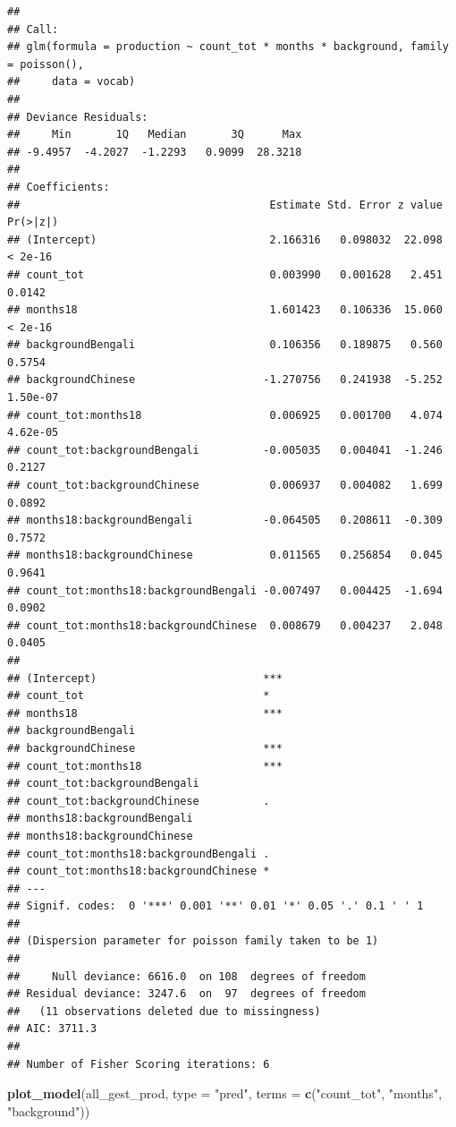 \documentclass[]{article}
\newenvironment{Shaded}{\begin{snugshade}}{\end{snugshade}}
\newcommand{\DataTypeTok}[1]{\textcolor[rgb]{0.13,0.29,0.53}{#1}}
\newcommand{\KeywordTok}[1]{\textcolor[rgb]{0.13,0.29,0.53}{\textbf{#1}}}
\newcommand{\NormalTok}[1]{#1}
\newcommand{\StringTok}[1]{\textcolor[rgb]{0.31,0.60,0.02}{#1}}
\begin{document}
\begin{verbatim}
## 
## Call:
## glm(formula = production ~ count_tot * months * background, family = poisson(), 
##     data = vocab)
## 
## Deviance Residuals: 
##     Min       1Q   Median       3Q      Max  
## -9.4957  -4.2027  -1.2293   0.9099  28.3218  
## 
## Coefficients:
##                                       Estimate Std. Error z value Pr(>|z|)
## (Intercept)                           2.166316   0.098032  22.098  < 2e-16
## count_tot                             0.003990   0.001628   2.451   0.0142
## months18                              1.601423   0.106336  15.060  < 2e-16
## backgroundBengali                     0.106356   0.189875   0.560   0.5754
## backgroundChinese                    -1.270756   0.241938  -5.252 1.50e-07
## count_tot:months18                    0.006925   0.001700   4.074 4.62e-05
## count_tot:backgroundBengali          -0.005035   0.004041  -1.246   0.2127
## count_tot:backgroundChinese           0.006937   0.004082   1.699   0.0892
## months18:backgroundBengali           -0.064505   0.208611  -0.309   0.7572
## months18:backgroundChinese            0.011565   0.256854   0.045   0.9641
## count_tot:months18:backgroundBengali -0.007497   0.004425  -1.694   0.0902
## count_tot:months18:backgroundChinese  0.008679   0.004237   2.048   0.0405
##                                         
## (Intercept)                          ***
## count_tot                            *  
## months18                             ***
## backgroundBengali                       
## backgroundChinese                    ***
## count_tot:months18                   ***
## count_tot:backgroundBengali             
## count_tot:backgroundChinese          .  
## months18:backgroundBengali              
## months18:backgroundChinese              
## count_tot:months18:backgroundBengali .  
## count_tot:months18:backgroundChinese *  
## ---
## Signif. codes:  0 '***' 0.001 '**' 0.01 '*' 0.05 '.' 0.1 ' ' 1
## 
## (Dispersion parameter for poisson family taken to be 1)
## 
##     Null deviance: 6616.0  on 108  degrees of freedom
## Residual deviance: 3247.6  on  97  degrees of freedom
##   (11 observations deleted due to missingness)
## AIC: 3711.3
## 
## Number of Fisher Scoring iterations: 6
\end{verbatim}

\begin{Shaded}
\begin{Highlighting}[]
\KeywordTok{plot_model}\NormalTok{(all_gest_prod, }\DataTypeTok{type =} \StringTok{"pred"}\NormalTok{, }\DataTypeTok{terms =} \KeywordTok{c}\NormalTok{(}\StringTok{"count_tot"}\NormalTok{, }\StringTok{"months"}\NormalTok{, }\StringTok{"background"}\NormalTok{))}
\end{Highlighting}
\end{Shaded}
\end{document}
